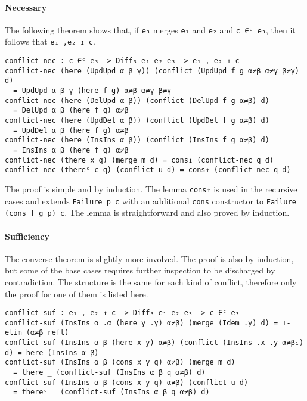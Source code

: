 \documentclass[../Thesis.tex]{subfiles}
\begin{document}
	\paragraph{Necessary}
	The following theorem shows that, if \texttt{e₃} merges \texttt{e₁} and
	\texttt{e₂} and \texttt{c ∈ᶜ e₃}, then it follows that \texttt{e₁ ,e₂ ↥ c}.
	
\begin{verbatim}
conflict-nec : c ∈ᶜ e₃ -> Diff₃ e₁ e₂ e₃ -> e₁ , e₂ ↥ c
conflict-nec (here (UpdUpd α β γ)) (conflict (UpdUpd f g α≠β α≠γ β≠γ) d) 
  = UpdUpd α β γ (here f g) α≠β α≠γ β≠γ
conflict-nec (here (DelUpd α β)) (conflict (DelUpd f g α≠β) d) 
  = DelUpd α β (here f g) α≠β
conflict-nec (here (UpdDel α β)) (conflict (UpdDel f g α≠β) d) 
  = UpdDel α β (here f g) α≠β
conflict-nec (here (InsIns α β)) (conflict (InsIns f g α≠β) d) 
  = InsIns α β (here f g) α≠β
conflict-nec (there x q) (merge m d) = cons↥ (conflict-nec q d)
conflict-nec (thereᶜ c q) (conflict u d) = cons↥ (conflict-nec q d)
\end{verbatim}

	The proof is simple and by induction. 
	The lemma \texttt{cons↥} is used in the
	recursive cases and extends \texttt{Failure p c} with an additional 
	\texttt{cons} constructor to \texttt{Failure (cons f g p) c}. The lemma
	is straightforward and also proved by induction.

	\paragraph{Sufficiency}
	The converse theorem is slightly more involved.
	The proof is also by induction, but some of the base cases requires further 
	inspection to be discharged by contradiction.
	The structure is the same for each kind of conflict, therefore only the
	proof for one of them is listed here.
	
\begin{verbatim}
conflict-suf : e₁ , e₂ ↥ c -> Diff₃ e₁ e₂ e₃ -> c ∈ᶜ e₃
conflict-suf (InsIns α .α (here y .y) α≠β) (merge (Idem .y) d) = ⊥-elim (α≠β refl)
conflict-suf (InsIns α β (here x y) α≠β) (conflict (InsIns .x .y α≠β₁) d) = here (InsIns α β)
conflict-suf (InsIns α β (cons x y q) α≠β) (merge m d) 
  = there _ (conflict-suf (InsIns α β q α≠β) d)
conflict-suf (InsIns α β (cons x y q) α≠β) (conflict u d) 
  = thereᶜ _ (conflict-suf (InsIns α β q α≠β) d)
\end{verbatim}
\end{document}

